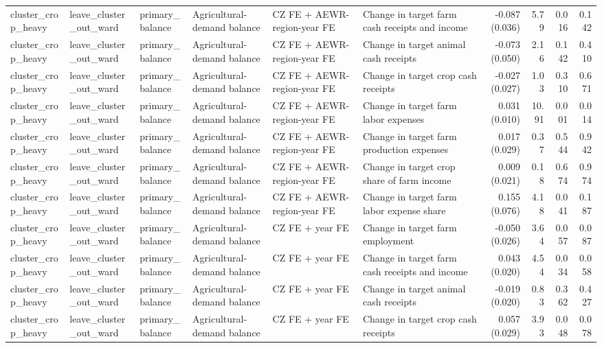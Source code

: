 \begin{tabular}{llllllrrrr}
cluster_crop_heavy & leave_cluster_out_ward & primary_balance & Agricultural-demand balance & CZ FE + AEWR-region-year FE & Change in target farm cash receipts and income & -0.087 (0.036) & 5.79 & 0.016 & 0.142 \\
cluster_crop_heavy & leave_cluster_out_ward & primary_balance & Agricultural-demand balance & CZ FE + AEWR-region-year FE & Change in target animal cash receipts & -0.073 (0.050) & 2.16 & 0.142 & 0.410 \\
cluster_crop_heavy & leave_cluster_out_ward & primary_balance & Agricultural-demand balance & CZ FE + AEWR-region-year FE & Change in target crop cash receipts & -0.027 (0.027) & 1.03 & 0.310 & 0.671 \\
cluster_crop_heavy & leave_cluster_out_ward & primary_balance & Agricultural-demand balance & CZ FE + AEWR-region-year FE & Change in target farm labor expenses & 0.031 (0.010) & 10.91 & 0.001 & 0.014 \\
cluster_crop_heavy & leave_cluster_out_ward & primary_balance & Agricultural-demand balance & CZ FE + AEWR-region-year FE & Change in target farm production expenses & 0.017 (0.029) & 0.37 & 0.544 & 0.942 \\
cluster_crop_heavy & leave_cluster_out_ward & primary_balance & Agricultural-demand balance & CZ FE + AEWR-region-year FE & Change in target crop share of farm income & 0.009 (0.021) & 0.18 & 0.674 & 0.974 \\
cluster_crop_heavy & leave_cluster_out_ward & primary_balance & Agricultural-demand balance & CZ FE + AEWR-region-year FE & Change in target farm labor expense share & 0.155 (0.076) & 4.18 & 0.041 & 0.187 \\
cluster_crop_heavy & leave_cluster_out_ward & primary_balance & Agricultural-demand balance & CZ FE + year FE & Change in target farm employment & -0.050 (0.026) & 3.64 & 0.057 & 0.087 \\
cluster_crop_heavy & leave_cluster_out_ward & primary_balance & Agricultural-demand balance & CZ FE + year FE & Change in target farm cash receipts and income & 0.043 (0.020) & 4.54 & 0.034 & 0.058 \\
cluster_crop_heavy & leave_cluster_out_ward & primary_balance & Agricultural-demand balance & CZ FE + year FE & Change in target animal cash receipts & -0.019 (0.020) & 0.83 & 0.362 & 0.427 \\
cluster_crop_heavy & leave_cluster_out_ward & primary_balance & Agricultural-demand balance & CZ FE + year FE & Change in target crop cash receipts & 0.057 (0.029) & 3.93 & 0.048 & 0.078 \\

\end{tabular}

